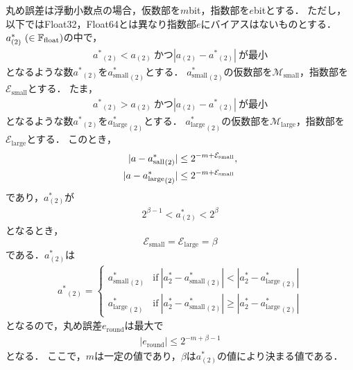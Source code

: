 丸め誤差は浮動小数点の場合，仮数部を$m$bit，指数部を$e$bitとする．
ただし，以下ではFloat32，Float64とは異なり指数部$e$にバイアスはないものとする．
$a^{\ast}_{(2)} \ (\in \mathbb{F}_{\text{float}})$の中で，
\begin{align*}
    {a^{\ast}}_{(2)} < a_{(2)}\ \text{かつ} |a_{(2)} - {a^{\ast}}_{(2)}| \ \text{が最小}
\end{align*}
となるような数${a^{\ast}}_{(2)}$を${a^{\ast}_{\mathrm{small}}}_{(2)}$とする．
${a^{\ast}_{\mathrm{small}}}_{(2)}$の仮数部を$\mathcal{M}_{\mathrm{small}}$，指数部を$\mathcal{E}_{\mathrm{small}}$とする．
たま，
\begin{align*}
    {a^{\ast}}_{(2)} > a_{(2)} \ \text{かつ} |a_{(2)} - {a^{\ast}}_{(2)}| \ \text{が最小}
\end{align*}
となるような数${a^{\ast}}_{(2)}$を${a^{\ast}_{\mathrm{large}}}_{(2)}$とする．
${a^{\ast}_{\mathrm{large}}}_{(2)}$の仮数部を$\mathcal{M}_{\mathrm{large}}$，指数部を$\mathcal{E}_{\mathrm{large}}$とする．
このとき，
\begin{align*}
    |a - {a^{\ast}_{\mathrm{sall}}}_{(2)}| &\leq 2^{-m+{\mathcal{E}_{\mathrm{small}}}}, \\
    |a - {a^{\ast}_{\mathrm{large}}}_{(2)}| &\leq 2^{-m+{\mathcal{E}_{\mathrm{small}}}}
\end{align*}
であり，$a^{\ast}_{(2)}$が
\begin{align*}
    2^{\beta -1} < a^{\ast}_{(2)} < 2^{\beta}
\end{align*}
となるとき，
\begin{equation*}
    \mathcal{E}_{\mathrm{small}} = \mathcal{E}_{\mathrm{large}} = \beta
\end{equation*}
である．$a^{\ast}_{(2)}$は
\begin{align*}
    {a^{\ast}}_{(2)} = \left\{ 
        \begin{array}{ll}
            {a^{\ast}_{\mathrm{small}}}_{(2)} &\text{if} \ |a^{\ast}_{2} - {a^{\ast}_{\mathrm{small}}}_{(2)} | < |a^{\ast}_{2} - {a^{\ast}_{\mathrm{large}}}_{(2)} | \\
            {a^{\ast}_{\mathrm{large}}}_{(2)} &\text{if} \ |a^{\ast}_{2} - {a^{\ast}_{\mathrm{small}}}_{(2)} | \geq |a^{\ast}_{2} - {a^{\ast}_{\mathrm{large}}}_{(2)} | 
        \end{array}
    \right.
\end{align*}
となるので，丸め誤差$e_{\mathrm{round}}$は最大で
\begin{align}
    \label{eq:rounderror_float}
    |e_{\mathrm{round}}| \leq 2^{-m+\beta -1}
\end{align}
となる．
ここで，$m$は一定の値であり，$\beta$は$a^{\ast}_{(2)}$の値により決まる値である．


